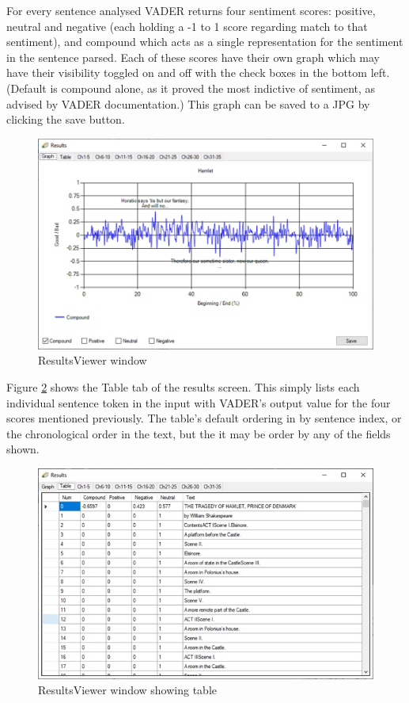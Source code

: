 \documentclass[a4paper]{article}
\begin{document}
        For every sentence analysed VADER returns four sentiment scores: positive, neutral and negative (each holding a -1 to 1 score regarding match to that sentiment), and compound which acts as a single representation for the sentiment in the sentence parsed. Each of these scores have their own graph which may have their visibility toggled on and off with the check boxes in the bottom left. (Default is compound alone, as it proved the most indictive of sentiment, as advised by VADER documentation.) This graph can be saved to a JPG by clicking the save button.
        \begin{figure}[H]
            \includegraphics[width=1\textwidth]{Misc/resultsviewer}
            \caption{ResultsViewer window}
            \label{fig:resultsviewer}
        \end{figure}
        Figure \ref{fig:resultstable} shows the Table tab of the results screen. This simply lists each individual sentence token in the input with VADER’s output value for the four scores mentioned previously. The table’s default ordering in by sentence index, or the chronological order in the text, but the it may be order by any of the fields shown.
        \begin{figure}[H]
            \includegraphics[width=1\textwidth]{Misc/resultstable}
            \caption{ResultsViewer window showing table}
            \label{fig:resultstable}
        \end{figure}
\end{document}

